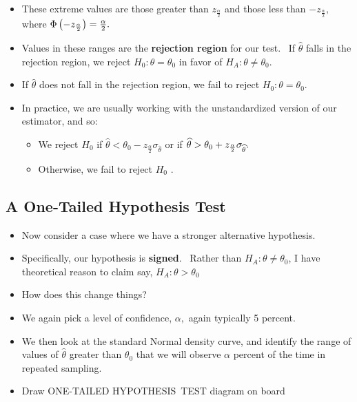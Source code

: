 \documentclass[11pt]{article}
\begin{document}
\begin{itemize}
\item These extreme values are those greater than $z_{\frac{\alpha }{2}}$
and those less than $-z_{\frac{\alpha }{2}},$ where $\Phi \left( -z_{\frac{%
\alpha }{2}}\right) =\frac{\alpha }{2}.$

\item Values in these ranges are the \textbf{rejection region }for our test.
\ If $\widehat{\theta }$ falls in the rejection region, we reject $%
H_{0}:\theta =\theta _{0}$ in favor of $H_{A}:\theta \neq \theta _{0}.$

\item If $\widehat{\theta }$ does not fall in the rejection region, we fail
to reject $H_{0}:\theta =\theta _{0}.$

\item In practice, we are usually working with the unstandardized version of
our estimator, and so:

\begin{itemize}
\item We reject $H_{0}$ if $\widehat{\theta }<\theta _{0}-z_{\frac{\alpha }{2%
}}\sigma _{\widehat{\theta }}$ or if $\widehat{\theta }>\theta _{0}+z_{\frac{%
\alpha }{2}}\sigma _{\widehat{\theta }}.$

\item Otherwise, we fail to reject $H_{0}$ .
\end{itemize}
\end{itemize}

\subsection{A One-Tailed Hypothesis Test}

\begin{itemize}
\item Now consider a case where we have a stronger alternative hypothesis. \ 

\item Specifically, our hypothesis is \textbf{signed}. \ Rather than $%
H_{A}:\theta \neq \theta _{0}$, I have theoretical reason to claim say, $%
H_{A}:\theta >\theta _{0}$

\item How does this change things?

\item We again pick a level of confidence, $\alpha ,$ again typically 5
percent.

\item We then look at the standard Normal density curve, and identify the
range of values of $\widehat{\theta }$ greater than $\theta _{0}$ that we
will observe $\alpha $ percent of the time in repeated sampling. \ 

\item Draw ONE-TAILED HYPOTHESIS\ TEST diagram on board
\end{itemize}
\end{document}
